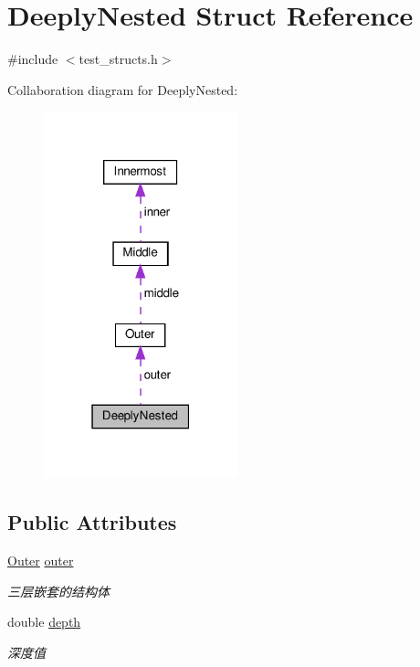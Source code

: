 \hypertarget{structDeeplyNested}{}\section{Deeply\+Nested Struct Reference}
\label{structDeeplyNested}


{\ttfamily \#include $<$test\+\_\+structs.\+h$>$}



Collaboration diagram for Deeply\+Nested\+:\nopagebreak
\begin{figure}[H]
\begin{center}
\leavevmode
\includegraphics[width=159pt]{structDeeplyNested__coll__graph}
\end{center}
\end{figure}
\subsection*{Public Attributes}
\begin{DoxyCompactItemize}
\item 
\hyperlink{structOuter}{Outer} \hyperlink{structDeeplyNested_aabba10c5eb09773cf0930a4f6794476a}{outer}
\begin{DoxyCompactList}\small\item\em 三层嵌套的结构体 \end{DoxyCompactList}\item 
double \hyperlink{structDeeplyNested_a489d8c12c4324e83350fda6374e20b37}{depth}
\begin{DoxyCompactList}\small\item\em 深度值 \end{DoxyCompactList}\end{DoxyCompactItemize}


